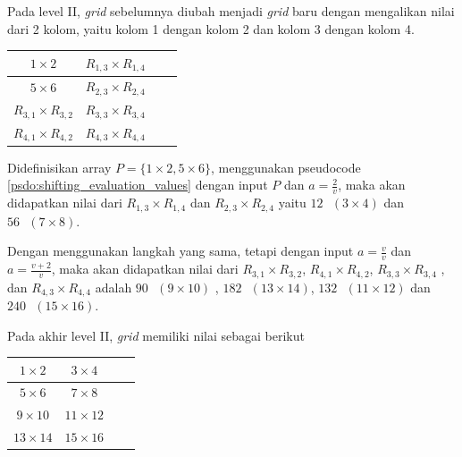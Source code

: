 Pada level II, \textit{grid} sebelumnya diubah menjadi \textit{grid} baru dengan mengalikan nilai dari 2 kolom, yaitu kolom 1 dengan kolom 2 dan kolom 3 dengan kolom 4.
\begin{table}[H]
	\centering
	\begin{tabular}{|c|c|c|c|} \hline
	$ 1  \times 2 $ & $ R_{1,3} \times R_{1,4} $ \\ \hline
	$ 5  \times 6 $ & $ R_{2,3} \times R_{2,4} $ \\ \hline
	$ R_{3,1} \times R_{3,2} $ & $ R_{3,3} \times R_{3,4} $ \\ \hline
	$ R_{4,1} \times R_{4,2} $ & $ R_{4,3} \times R_{4,4} $ \\ \hline
	\end{tabular}
\end{table}
Didefinisikan array $ P = \{1 \times 2, 5 \times 6 \}$, menggunakan pseudocode \ref{psdo:shifting_evaluation_values} dengan input $ P $ dan $ a = \frac{2}{v} $, maka akan didapatkan nilai dari $ R_{1,3} \times R_{1,4} $ dan $ R_{2,3} \times R_{2,4} $ yaitu $ 12 \text{ }(3 \times 4) $ dan $ 56 \text{ } (7 \times 8) $.

Dengan menggunakan langkah yang sama, tetapi dengan input $ a = \frac{v}{v} $ dan $ a = \frac{v+2}{v} $, maka akan didapatkan nilai dari $ R_{3,1} \times R_{3,2} $, $ R_{4,1} \times R_{4,2} $, $ R_{3,3} \times R_{3,4} $ , dan $ R_{4,3} \times R_{4,4} $ adalah $ 90 \text{ } (9 \times 10) $ , $ 182 \text{ } ( 13 \times 14) $, $ 132 \text{ } (11 \times 12) $ dan $ 240 \text{ } ( 15 \times 16) $.



Pada akhir level II, \textit{grid} memiliki nilai sebagai berikut
\begin{table}[H]
	\centering
	\begin{tabular}{|c|c|c|c|} \hline
	$ 1  \times 2 $ & $ 3 \times 4 $ \\ \hline
	$ 5  \times 6 $ & $ 7 \times 8 $ \\ \hline
	$ 9  \times 10 $ & $ 11 \times 12 $ \\ \hline
	$ 13 \times 14 $ & $ 15 \times 16 $ \\ \hline
	\end{tabular}
\end{table}

